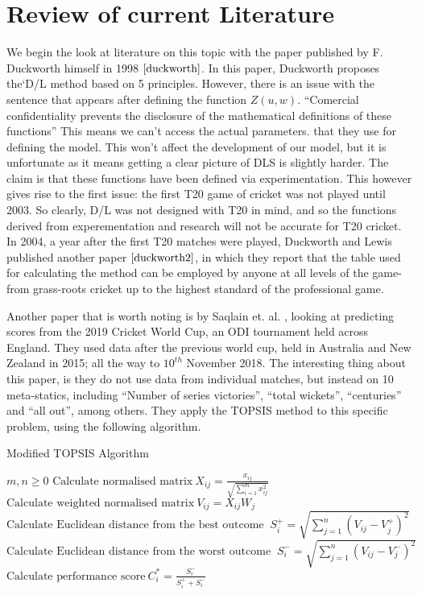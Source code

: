 \section{Review of current Literature}
We begin the look at literature on this topic with the paper published by F. Duckworth himself in 1998 $\cite{duckworth}$. In this paper, 
Duckworth proposes the`D/L method based on 5 principles. However, there is an issue with the sentence that appears after defining the function $Z(u,w)$.
``Comercial confidentiality prevents the disclosure of the mathematical definitions of these functions'' This means we can't access the actual parameters. 
that they use for defining the model. This won't affect the development of our model, but it is unfortunate as it means getting a clear picture of DLS is slightly harder.
The claim is that these functions have been defined via experimentation. This however gives rise to the first issue: the first T20 game of cricket was not played until 2003. 
So clearly, D/L was not designed with T20 in mind, and so the functions derived from experementation and research will not be accurate for T20 cricket. \\

In 2004, a year after the first T20 matches were played, Duckworth and Lewis published another paper $\cite{duckworth2}$, in which they report
that the table used for calculating the method can be employed by anyone at all levels of the game- from grass-roots cricket up to the highest standard of 
the professional game. 

Another paper that is worth noting is by Saqlain et. al. \cite{saqlain}, looking at predicting scores from the 2019 Cricket World Cup, an ODI
tournament held across England. They used data after the previous world cup, held in Australia and New Zealand in 2015; all the way to $10^{th}$ November
2018. The interesting thing about this paper, is they do not use data from individual matches, but instead on 10 meta-statics, including 
``Number of series victories'', ``total wickets'', ``centuries'' and ``all out'', among others. They apply the TOPSIS method to this specific problem, using the 
following algorithm. \\
\begin{algorithm}
\caption{Modified TOPSIS Algorithm}\label{TOPSIS}
\begin{algorithmic}[1]
    \Require $m,n \geq 0$
    \State $\text{Calculate normalised matrix} \ X_{ij} = \frac{x_{ij}}{\sqrt{\sum_{i=1}^mx_{ij}^2}}$
    \State $\text{Calculate weighted normalised matrix} \ V_{ij}=X_{ij}W_j$
        \State $\text{Calculate Euclidean distance from the best outcome } \ S_i^+ = \sqrt{\sum_{j=1}^n(V_{ij}-V_j^+)^2} \ $
        \State $\text{Calculate Euclidean distance from the worst outcome } \ S_i^- = \sqrt{\sum_{j=1}^n(V_{ij}-V_j^-)^2} \ $
    \EndFor
    \State $\text{Calculate performance score} \ C_i^* = \frac{S_i^-}{S_i^+  + S_i^-}$
\end{algorithmic}
\end{algorithm}

